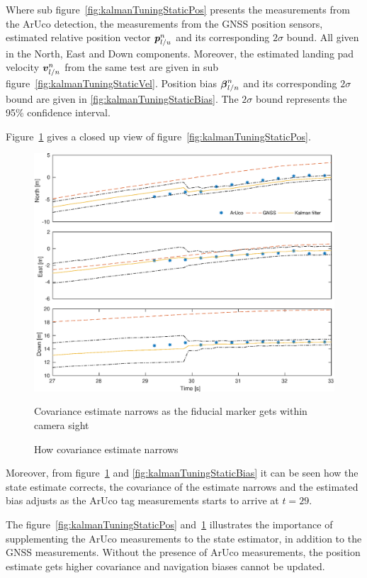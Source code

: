 Where sub figure~\ref{fig:kalmanTuningStaticPos} presents the measurements from the ArUco detection, the measurements from the \gls{GNSS} position sensors, estimated relative position vector $\boldsymbol{p}^{n}_{l/u}$ and its corresponding $2\sigma$ bound. All given in the North, East and Down components. Moreover, the estimated landing pad velocity $\boldsymbol{v}^{n}_{l/n}$ from the same test are given in sub figure~\ref{fig:kalmanTuningStaticVel}. Position bias $\boldsymbol{\beta}^{n}_{l/n}$ and its corresponding $2\sigma$ bound are given in \ref{fig:kalmanTuningStaticBias}. The $2 \sigma$ bound represents the 95\% confidence interval.

Figure~\ref{fig:kalmanTuningStaticPosZoom} gives a closed up view of figure~\ref{fig:kalmanTuningStaticPos}.
\begin{figure}
	\centering
	\includegraphics[width=\linewidth]{img/plot/static/kalmanTuningStaticPosZoom.eps}
	\caption{How covariance estimate narrows}{Covariance estimate narrows as the fiducial marker gets within camera sight}
	\label{fig:kalmanTuningStaticPosZoom}
\end{figure}
Moreover, from figure~\ref{fig:kalmanTuningStaticPosZoom} and \ref{fig:kalmanTuningStaticBias} it can be seen how the state estimate corrects, the covariance of the estimate narrows and the estimated bias adjusts as the ArUco tag measurements starts to arrive at $t=29$. 

The figure~\ref{fig:kalmanTuningStaticPos} and~\ref{fig:kalmanTuningStaticPosZoom} illustrates the importance of supplementing the ArUco measurements to the state estimator, in addition to the \gls{GNSS} measurements. Without the presence of ArUco measurements, the position estimate gets higher covariance and navigation biases cannot be updated. 

